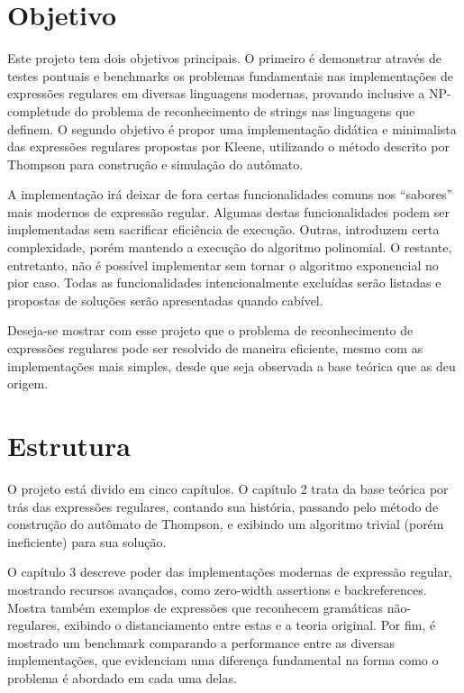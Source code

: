 \documentclass[a4paper,12pt,oneside,onecolumn]{uerj}
\begin{document}
\section{Objetivo}

Este projeto tem dois objetivos principais. O primeiro é demonstrar através de testes pontuais e benchmarks os problemas fundamentais nas implementações de expressões regulares em diversas linguagens modernas, provando inclusive a NP-completude do problema de reconhecimento de strings nas linguagens que definem. O segundo objetivo é propor uma implementação didática e minimalista das expressões regulares propostas por Kleene, utilizando o método descrito por Thompson para construção e simulação do autômato. 

A implementação irá deixar de fora certas funcionalidades comuns nos “sabores” mais modernos de expressão regular. Algumas destas funcionalidades podem ser implementadas sem sacrificar eficiência de execução. Outras, introduzem certa complexidade, porém mantendo a execução do algoritmo polinomial. O restante, entretanto, não é possível implementar sem tornar o algoritmo exponencial no pior caso. Todas as funcionalidades intencionalmente excluídas serão listadas e propostas de soluções serão apresentadas quando cabível.

Deseja-se mostrar com esse projeto que o problema de reconhecimento de expressões regulares pode ser resolvido de maneira eficiente, mesmo com as implementações mais simples, desde que seja observada a base teórica que as deu origem.

\section{Estrutura}

O projeto está divido em cinco capítulos. O capítulo 2 trata da base teórica por trás das expressões regulares, contando sua história, passando pelo método de construção do autômato de Thompson, e exibindo um algoritmo trivial (porém ineficiente) para sua solução.

O capítulo 3 descreve poder das implementações modernas de expressão regular, mostrando recursos avançados, como zero-width assertions e backreferences. Mostra também exemplos de expressões que reconhecem gramáticas não-regulares, exibindo o distanciamento entre estas e a teoria original. Por fim, é mostrado um benchmark comparando a performance entre as diversas implementações, que evidenciam uma diferença fundamental na forma como o problema é abordado em cada uma delas.
\end{document}
